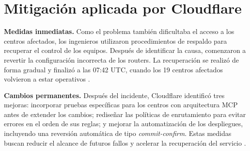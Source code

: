 
\section{Mitigación aplicada por Cloudflare}

\textbf{Medidas inmediatas.}
Como el problema también dificultaba el acceso a los
centros afectados, los ingenieros utilizaron
procedimientos de respaldo para recuperar el control
de los equipos. Después de identificar la causa,
comenzaron a revertir la configuración incorrecta
de los routers. La recuperación se realizó de forma
gradual y finalizó a las 07:42 UTC, cuando los 19
centros afectados volvieron a estar operativos
\cite{cloudflare2022}.

\textbf{Cambios permanentes.}
Después del incidente, Cloudflare identificó tres
mejoras: incorporar pruebas específicas para los
centros con arquitectura MCP antes de extender los
cambios; rediseñar las políticas de enrutamiento
para evitar errores en el orden de sus reglas; y
mejorar la automatización de los despliegues,
incluyendo una reversión automática de tipo
\textit{commit-confirm}. Estas medidas buscan reducir
el alcance de futuros fallos y acelerar la recuperación
del servicio \cite{cloudflare2022}.
